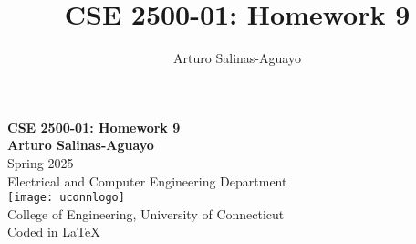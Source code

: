 \documentclass[12pt]{article}
\author{Arturo Salinas-Aguayo}
\title{CSE 2500-01: Homework 9}
\begin{document}
\newcommand{\closure}[2][3]{%
	{}\mkern#1mu\overline{\mkern-#1mu#2}}
\newcommand\ncoverline[1]{\mkern1mu\overline{\mkern-1mu#1\mkern-1mu}\mkern1mu}
\begin{titlepage}
	\centering
	\vspace*{3cm}
	\huge\textbf{CSE 2500-01: Homework 9}\\
	\vspace{5cm}
	\Large\textbf{Arturo Salinas-Aguayo}\\
	\normalsize
	Spring 2025\\
	Electrical and Computer Engineering Department\\
	\vfill
	\texttt{[image: uconnlogo]}\\
	College of Engineering, University of Connecticut\\
	\scriptsize{Coded in \LaTeX}
	\vspace*{1cm}
\end{titlepage}
\end{document}
